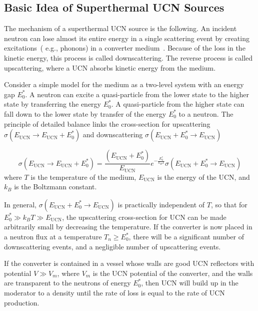 
\subsection{Basic Idea of Superthermal UCN Sources\label{sec:basic_idea}}
The mechanism of a superthermal UCN source is the following.  An
incident neutron can lose almost its entire energy in a single
scattering event by creating excitations~( e.g., phonons) in a
converter medium~\cite{ucnbook, Golub75}. Because of the loss in the
kinetic energy, this process is called downscattering. The reverse
process is called upscattering, where a UCN absorbs kinetic energy from
the medium.


Consider a simple model for the medium as a two-level system with an
energy gap $E_0^*$.  A neutron can excite a quasi-particle from the
lower state to the higher state by transferring the energy $E_0^*$. A
quasi-particle from the higher state can fall down to the lower state
by transfer of the energy $E_0^*$ to a neutron.  The principle of
detailed balance links the cross-section for upscattering
$\sigma(E_{\text{UCN}} \rightarrow E_{\text{UCN}}+E_0^*)$ and downscattering
$\sigma(E_{\text{UCN}}+E_0^* \rightarrow E_{\text{UCN}})$~\cite{ucnbook}

\begin{equation}
\label{eqn:detailed_balance}
\sigma(E_{\text{UCN}} \rightarrow E_{\text{UCN}}+E_0^*)= \frac{(E_{\text{UCN}}+E_0^*)}{E_{\text{UCN}}}
e^{-\frac{E_0^*}{k_B T}}\sigma(E_{\text{UCN}}+E_0^* \rightarrow E_{\text{UCN}})
\end{equation}
where $T$ is the temperature of the medium, $E_{\text{UCN}}$ is the
energy of the UCN, and $k_B$ is the Boltzmann constant.

In general, $\sigma(E_{\text{UCN}}+E_0^* \rightarrow E_{\text{UCN}})$
is practically independent of $T$, so that for
$E_0^* \gg k_B T \gg E_{\text{UCN}}$, the upscattering cross-section
for UCN can be made arbitrarily small by decreasing the
temperature. If the converter is now placed in a neutron flux at a
temperature $T_n \geq E_0^*$, there will be a significant number of
downscattering events, and a negligible number of upscattering events.

If the converter is contained in a vessel whose walls are good UCN
reflectors with potential $V \gg V_m$, where $V_m$ is the UCN potential
of the converter, and the walls are transparent to the neutrons of
energy $E_0^*$, then UCN will build up in the moderator to a density
until the rate of loss is equal to the rate of UCN production.

